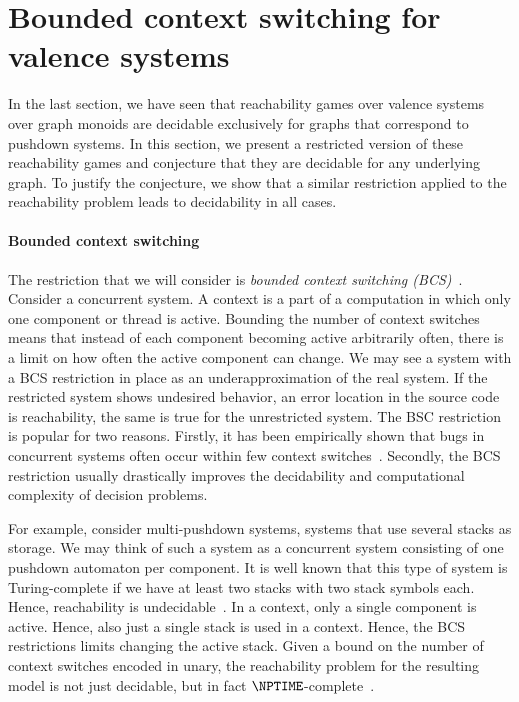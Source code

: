 \documentclass[../../diss.tex]{subfiles}
\begin{document}
\section{Bounded context switching for valence systems}%
\label{Section:ValenceBCS}%

In the last section, we have seen that reachability games over valence systems over graph monoids are decidable exclusively for graphs that correspond to pushdown systems.
In this section, we present a restricted version of these reachability games and conjecture that they are decidable for any underlying graph.
To justify the conjecture, we show that a similar restriction applied to the reachability problem leads to decidability in all cases.

\paragraph{Bounded context switching}

The restriction that we will consider is \emph{bounded context switching (BCS)}~\cite{QadeerR05}.
Consider a concurrent system.
A context is a part of a computation in which only one component or thread is active.
Bounding the number of context switches means that instead of each component becoming active arbitrarily often, there is a limit on how often the active component can change.
We may see a system with a BCS restriction in place as an underapproximation of the real system.
If the restricted system shows undesired behavior, \eg an error location in the source code is reachability, the same is true for the unrestricted system.
The BSC restriction is popular for two reasons.
Firstly, it has been empirically shown that bugs in concurrent systems often occur within few context switches~\cite{MusuvathiQ07,LuSSZ08}.
Secondly, the BCS restriction usually drastically improves the decidability and computational complexity of decision problems.

For example, consider multi-pushdown systems, systems that use several stacks as storage.
We may think of such a system as a concurrent system consisting of one pushdown automaton per component.
It is well known that this type of system is Turing-complete if we have at least two stacks with two stack symbols each.
Hence, reachability is undecidable~\cite{Ramalingam00}.
In a context, only a single component is active.
Hence, also just a single stack is used in a context.
Hence, the BCS restrictions limits changing the active stack.
Given a bound on the number of context switches encoded in unary, the reachability problem for the resulting model is not just decidable, but in fact $\NPTIME$-complete~\cite{QadeerR05}.
\end{document}
